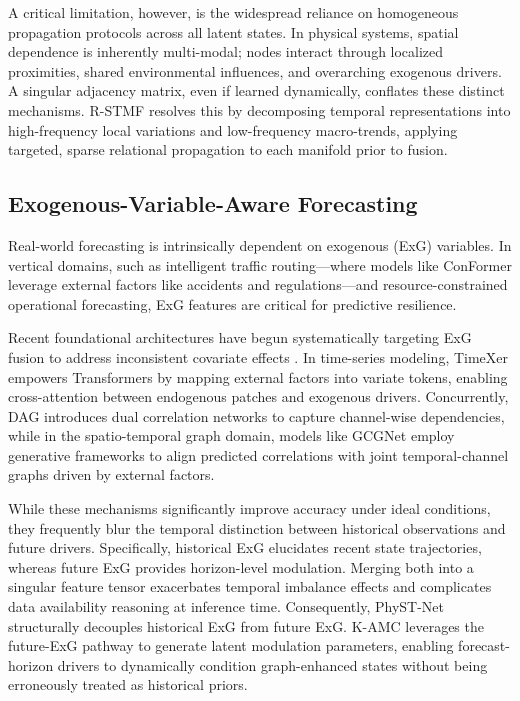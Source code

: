 A critical limitation, however, is the widespread reliance on homogeneous propagation protocols across all latent states. In physical systems, spatial dependence is inherently multi-modal; nodes interact through localized proximities, shared environmental influences, and overarching exogenous drivers. A singular adjacency matrix, even if learned dynamically, conflates these distinct mechanisms. R-STMF resolves this by decomposing temporal representations into high-frequency local variations and low-frequency macro-trends, applying targeted, sparse relational propagation to each manifold prior to fusion.

\subsection{Exogenous-Variable-Aware Forecasting}
\label{sec:related_exg}
Real-world forecasting is intrinsically dependent on exogenous (ExG) variables. In vertical domains, such as intelligent traffic routing---where models like ConFormer \cite{conformer2025} leverage external factors like accidents and regulations---and resource-constrained operational forecasting, ExG features are critical for predictive resilience. 

Recent foundational architectures have begun systematically targeting ExG fusion to address inconsistent covariate effects \cite{exost2025}. In time-series modeling, TimeXer \cite{wang2024timexer} empowers Transformers by mapping external factors into variate tokens, enabling cross-attention between endogenous patches and exogenous drivers. Concurrently, DAG \cite{dag2025} introduces dual correlation networks to capture channel-wise dependencies, while in the spatio-temporal graph domain, models like GCGNet \cite{gcgnet2026} employ generative frameworks to align predicted correlations with joint temporal-channel graphs driven by external factors.

While these mechanisms significantly improve accuracy under ideal conditions, they frequently blur the temporal distinction between historical observations and future drivers. Specifically, historical ExG elucidates recent state trajectories, whereas future ExG provides horizon-level modulation. Merging both into a singular feature tensor exacerbates temporal imbalance effects \cite{exost2025} and complicates data availability reasoning at inference time. Consequently, PhyST-Net structurally decouples historical ExG from future ExG. K-AMC leverages the future-ExG pathway to generate latent modulation parameters, enabling forecast-horizon drivers to dynamically condition graph-enhanced states without being erroneously treated as historical priors.

